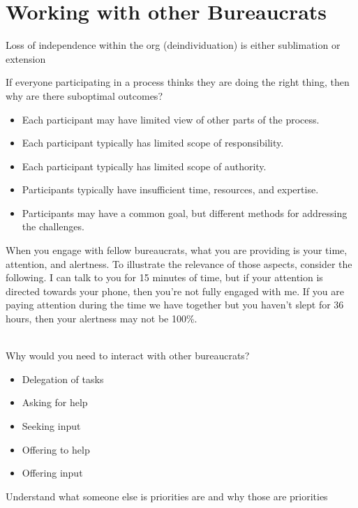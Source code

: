 \chapter{Working with other Bureaucrats\label{sec:working-with-other-bureaucrats}}

Loss of independence within the org (deindividuation) is either sublimation or extension 

If everyone participating in a process thinks they are doing the right thing, then why are there suboptimal outcomes?
\begin{itemize}
    \item Each participant may have limited view of other parts of the process.
    \item Each participant typically has limited scope of responsibility.
    \item Each participant typically has limited scope of authority.
    \item Participants typically have insufficient time, resources, and expertise.
    \item Participants may have a common goal, but different methods for addressing the challenges.
\end{itemize}


When you engage with fellow bureaucrats, what you are providing is your time, attention, and alertness. To illustrate the relevance of those aspects, consider the following. I can talk to you for 15 minutes of time, but if your attention is directed towards your phone, then you're not fully engaged with me. If you are paying attention during the time we have together but you haven't slept for 36 hours, then your alertness may not be 100\%. 

\ \\

Why would you need to interact with other bureaucrats?
\begin{itemize}
    \item Delegation of tasks
    \item Asking for help
    \item Seeking input
    \item Offering to help
    \item Offering input
\end{itemize}

Understand what someone else is priorities are and why those are priorities

